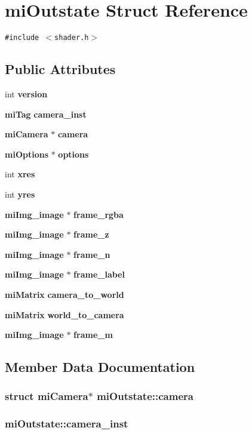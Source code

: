 \section{mi\-Outstate Struct Reference}
\label{structmiOutstate}
{\tt \#include $<$shader.h$>$}

\subsection*{Public Attributes}
\begin{CompactItemize}
\item 
int {\bf version}
\item 
{\bf mi\-Tag} {\bf camera\_\-inst}
\item 
{\bf mi\-Camera} $\ast$ {\bf camera}
\item 
{\bf mi\-Options} $\ast$ {\bf options}
\item 
int {\bf xres}
\item 
int {\bf yres}
\item 
{\bf mi\-Img\_\-image} $\ast$ {\bf frame\_\-rgba}
\item 
{\bf mi\-Img\_\-image} $\ast$ {\bf frame\_\-z}
\item 
{\bf mi\-Img\_\-image} $\ast$ {\bf frame\_\-n}
\item 
{\bf mi\-Img\_\-image} $\ast$ {\bf frame\_\-label}
\item 
{\bf mi\-Matrix} {\bf camera\_\-to\_\-world}
\item 
{\bf mi\-Matrix} {\bf world\_\-to\_\-camera}
\item 
{\bf mi\-Img\_\-image} $\ast$ {\bf frame\_\-m}
\end{CompactItemize}


\subsection{Member Data Documentation}
\subsubsection{\setlength{\rightskip}{0pt plus 5cm}struct {\bf mi\-Camera}$\ast$ {\bf mi\-Outstate::camera}}\label{structmiOutstate_o2}


\subsubsection{ {\bf mi\-Outstate::camera\_\-inst}}\label{structmiOutstate_o1}


